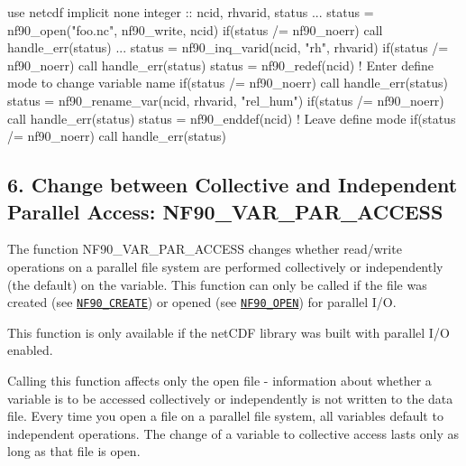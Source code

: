 \begin{DoxyCode}
\textcolor{keywordtype}{use }netcdf
\textcolor{keywordtype}{implicit none}
\textcolor{keywordtype}{integer} :: ncid, rhvarid, status
...
status = nf90\_open(\textcolor{stringliteral}{"foo.nc"}, nf90\_write, ncid)
\textcolor{keywordflow}{if}(status /= nf90\_noerr) \textcolor{keyword}{call }handle\_err(status)
...
status = nf90\_inq\_varid(ncid, \textcolor{stringliteral}{"rh"}, rhvarid)
\textcolor{keywordflow}{if}(status /= nf90\_noerr) \textcolor{keyword}{call }handle\_err(status)
status = nf90\_redef(ncid)  \textcolor{comment}{! Enter define mode to change variable name}
\textcolor{keywordflow}{if}(status /= nf90\_noerr) \textcolor{keyword}{call }handle\_err(status)
status = nf90\_rename\_var(ncid, rhvarid, \textcolor{stringliteral}{"rel\_hum"})
\textcolor{keywordflow}{if}(status /= nf90\_noerr) \textcolor{keyword}{call }handle\_err(status)
status = nf90\_enddef(ncid) \textcolor{comment}{! Leave define mode}
\textcolor{keywordflow}{if}(status /= nf90\_noerr) \textcolor{keyword}{call }handle\_err(status)
\end{DoxyCode}
\hypertarget{f90-variables_f90-change-between-collective-and-independent-parallel-access-nf90_var_par_access}{}\subsection{6. Change between Collective and Independent Parallel Access\+: N\+F90\+\_\+\+V\+A\+R\+\_\+\+P\+A\+R\+\_\+\+A\+C\+C\+E\+S\+S }\label{f90-variables_f90-change-between-collective-and-independent-parallel-access-nf90_var_par_access}
The function N\+F90\+\_\+\+V\+A\+R\+\_\+\+P\+A\+R\+\_\+\+A\+C\+C\+E\+SS changes whether read/write operations on a parallel file system are performed collectively or independently (the default) on the variable. This function can only be called if the file was created (see \href{#NF90_005fCREATE}{\tt N\+F90\+\_\+\+C\+R\+E\+A\+TE}) or opened (see \href{#NF90_005fOPEN}{\tt N\+F90\+\_\+\+O\+P\+EN}) for parallel I/O.

This function is only available if the net\+C\+DF library was built with parallel I/O enabled.

Calling this function affects only the open file -\/ information about whether a variable is to be accessed collectively or independently is not written to the data file. Every time you open a file on a parallel file system, all variables default to independent operations. The change of a variable to collective access lasts only as long as that file is open.

